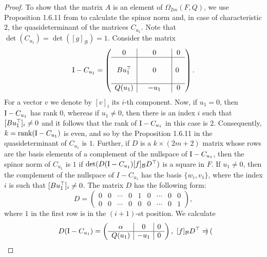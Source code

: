 \begin{proof}
    To show that the matrix $A$ is an element of $\Omega_{2m}(F,Q)$,
    we use Proposition 1.6.11 from \cite{BrayHoltRD} to calculate the spinor 
    norm and, in case of characteristic $2$, the quasideterminant of the
    matrices $C_{u_1}$. Note that $\det(C_{u_1}) = \det([g]_{\mathcal{B}}) = 1$.
    Consider the matrix
    \begin{equation*}
	\mathord{\mathrm{I}}-C_{u_1} = \left(
	    \begin{array}{c|c|c}
		0 & 0 & 0  \\ \hline 
		 & & \\
		Bu_1^\top &\ \ \ \ \ 0\ \ \ \ \  & 0\  \\ 
		 & & \\ \hline 
		Q(u_1) & -u_1 & 0
	    \end{array}
	\right).
    \end{equation*}
    For a vector $v$ we denote by $[v]_i$ its $i$-th component. Now, 
    if $u_1 = 0$, then $\mathord{\mathrm{I}}-C_{u_1}$ has rank $0$, whereas if $u_1 \neq 0$, then
    there is an index $i$ such that $[Bu_1^\top]_i \neq 0$ and it follows that
    the rank of $\mathord{\mathrm{I}}-C_{u_1}$ in this case is $2$. Consequently, $k=\operatorname{rank}(\mathord{\mathrm{I}}-C_{u_1})$ is
    even, and so by the Proposition 1.6.11 in \cite{BrayHoltRD} the quasideterminant of $C_{u_1}$
    is $1$. Further, if $D$ is a $k\times (2m+2)$ matrix whose rows are the basis
    elements of a complement of the nullspace of $\mathord{\mathrm{I}}-C_{u_1}$, then the spinor norm of
     $C_{u_1}$ is $1$
    if $\det(D(\mathord{\mathrm{I}}-C_{u_1}) [f]_{\mathcal{B}} D^\top)$ is a square in $F$. If $u_1 \neq 0$,
    then the complement of the nullspace of $I-C_{u_1}$ has the basis
    $\{ w_i, v_1 \}$, where the index $i$ is such that $[Bu_1^\top]_i \neq 0$. 
    The matrix $D$ has the following form:
    \begin{equation*}
	D = \begin{pmatrix}
	    0 & 0 & \cdots & 0 & 1 & 0 & \cdots & 0 & 0 \\
	    0 & 0 & \cdots & 0 & 0 & 0 & \cdots & 0 & 1
	\end{pmatrix},
    \end{equation*}
    where $1$ in the first row is in the $(i+1)$-st position. We calculate
    \begin{equation*}
	D(\II-C_{u_1}) = \left(
	    \begin{array}{c|c|c}
		\alpha & 0 & 0 \\ \hline
		Q(u_1) & -u_1 & 0
	    \end{array}
	\right),\ 
	[f]_{\mathcal{B}} D^\T = \begin{pmatrix}

\end{pmatrix}
\end{equation*}
\end{proof}
